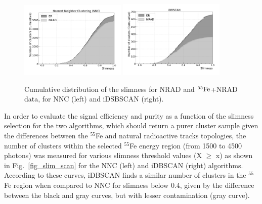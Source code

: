 \documentclass[a4paper,11pt]{article}
\begin{document}
\begin{figure}[ht]
\centering
\includegraphics[width=0.45\textwidth]{CDF_Slimness_2D.pdf}
\includegraphics[width=0.45\textwidth]{CDF_Slimness_3D.pdf}
\caption{Cumulative distribution of the slimness for NRAD and $\rm ^{55}Fe$+NRAD data, for NNC (left) and iDSBSCAN (right).} 
\label{fig_cdf_slim}
\end{figure}


In order to evaluate the signal efficiency and purity as a function of the slimness selection for the two algorithms,
which should return a purer cluster sample given the differences between the $^{55}$Fe and natural radioactive tracks topologies, the number of clusters within the selected $^{55}$Fe energy region (from 1500 to 4500 photons) was measured for various slimness threshold values (X $\geqslant$ x) as shown in Fig.~\ref{fig_slim_scan} for the NNC (left) and iDBSCAN (right) algorithms.
According to these curves, iDBSCAN finds a similar number of clusters in the $^{55}$Fe region when compared to NNC for slimness below 0.4, given by the difference between the black and gray curves, but with lesser contamination (gray curve).
\end{document}
